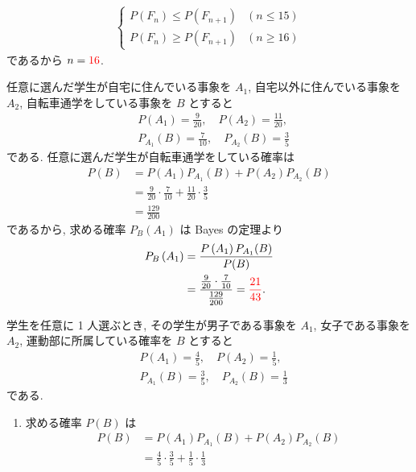 \begin{qenumerate}
{\begin{enumerate}
{\begin{align}
					\begin{cases}
						P\left(F_{n}\right)\leq P\left(F_{n + 1}\right) & (n\leq 15) \\
						P\left(F_{n}\right)\geq P\left(F_{n + 1}\right) & (n\geq 16)
					\end{cases}
				\end{align}
				であるから $n = \textcolor{red}{16}$.
			}
		\end{enumerate}
	}
	\item{
		任意に選んだ学生が自宅に住んでいる事象を $A_{1}$, 自宅以外に住んでいる事象を $A_{2}$, 自転車通学をしている事象を $B$ とすると
		\begin{align}
			& P\left(A_{1}\right) = \frac{9}{20}, \quad P\left(A_{2}\right) = \frac{11}{20}, \\
			& P_{A_{1}}(B) = \frac{7}{10}, \quad P_{A_{2}}(B) = \frac{3}{5}
		\end{align}
		である.
		任意に選んだ学生が自転車通学をしている確率は
		\begin{align}
			P(B) &= P\left(A_{1}\right)P_{A_{1}}(B) + P\left(A_{2}\right)P_{A_{2}}(B) \\
				&= \frac{9}{20}\cdot\frac{7}{10} + \frac{11}{20}\cdot\frac{3}{5} \\
				&= \frac{129}{200}
		\end{align}
		であるから, 求める確率 $P_{B}\left(A_{1}\right)$ は Bayes の定理より
		\begin{align}
			P_{B}\left(A_{1}\right) &= \frac{P\left(A_{1}\right)P_{A_{1}}(B)}{P(B)} \\
				&=\frac{\frac{9}{20}\cdot\frac{7}{10}}{\frac{129}{200}} = \textcolor{red}{\frac{21}{43}}.
		\end{align}
	}
	\item{
		学生を任意に 1 人選ぶとき, その学生が男子である事象を $A_{1}$, 女子である事象を $A_{2}$, 運動部に所属している確率を $B$ とすると
		\begin{align}
			& P\left(A_{1}\right) = \frac{4}{5}, \quad P\left(A_{2}\right) = \frac{1}{5}, \\
			& P_{A_{1}}(B) = \frac{3}{5}, \quad P_{A_{2}}(B) = \frac{1}{3}
		\end{align}
		である.
		\begin{enumerate}
			\item{
				求める確率 $P(B)$ は
				\begin{align}
					P(B) &= P\left(A_{1}\right)P_{A_{1}}(B) + P\left(A_{2}\right)P_{A_{2}}(B) \\
						&= \frac{4}{5}\cdot\frac{3}{5} + \frac{1}{5}\cdot\frac{1}{3} \\

\end{align}}
\end{enumerate}}
\end{qenumerate}
